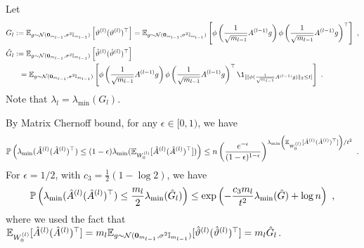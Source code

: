 Let
\begin{align*}
\hspace*{-10mm}
G_l & := \E_{g \sim \cN(\bm{0}_{m_{l-1}},\sigma^2 \I_{m_{l-1}})}\left[ \vartheta^{(l)} (\vartheta^{(l)})^\top \right] = \E_{g \sim \cN(\bm{0}_{m_{l-1}},\sigma^2 \I_{m_{l-1}})}\left[ \phi\left( \frac{1}{\sqrt{m_{l-1}}} A^{(l-1)} g \right) \phi\left( \frac{1}{\sqrt{m_{l-1}}} A^{(l-1)} g \right)^\top \right] ~, \\
\hat{G}_l & := \E_{g \sim \cN(\bm{0}_{m_{l-1}},\sigma^2 \I_{m_{l-1}})}\left[ \hat{\vartheta}^{(l)} (\hat{\vartheta}^{(l)})^\top \right] \\
& ~~= \E_{g \sim \cN(\bm{0}_{m_{l-1}},\sigma^2 \I_{m_{l-1}})}\left[ \phi\left( \frac{1}{\sqrt{m_{l-1}}} A^{(l-1)} g\right) \phi \left( \frac{1}{\sqrt{m_{l-1}}} A^{(l-1)} g \right)^\top \1_{[\| \phi ( \frac{1}{\sqrt{m_{l-1}}} A^{(l-1)} g) \|_2 \leq t]} \right] ~. 
\end{align*}
Note that $\lambda_l = \lambda_{\min}(G_l)$.

By Matrix Chernoff bound, for any $\epsilon \in [0,1)$, we have
\begin{align*}
\P\left( \lambda_{\min}( \hat{A}^{(l)} ( \hat{A}^{(l)})^\top ) \leq (1-\epsilon) \lambda_{\min}( \E_{W_0^{(l)}}[ \hat{A}^{(l)} ( \hat{A}^{(l)})^\top ]) \right) \leq n \left(\frac{e^{-\epsilon}}{(1-\epsilon)^{1-\epsilon}} \right)^{\lambda_{\min}\left(\E_{W_0^{(l)}}[\hat{A}^{(l)} ( \hat{A}^{(l)})^\top ]\right)/t^2}~.
\end{align*}
For $\epsilon=1/2$, with $c_3 = \frac{1}{2}(1 - \log 2)$, we have 
\begin{align*}
\P\left( \lambda_{\min}( \hat{A}^{(l)} ( \hat{A}^{(l)})^\top ) \leq \frac{m_l}{2} \lambda_{\min}(\hat{G}_l) \right) \leq \exp\left( - \frac{c_3 m_l}{t^2} \lambda_{\min}(\hat{G}) + \log n \right)~,
\end{align*}
where we used the fact that $\E_{W_0^{(l)}}[\hat{A}^{(l)}(\hat{A}^{(l)})^\top]=m_l\E_{g \sim \cN(\bm{0}_{m_{l-1}},\sigma^2 \I_{m_{l-1}})}[\hat{\vartheta}^{(l)}(\hat{\vartheta}^{(l)})^\top]=m_l\hat{G}_l$. 

